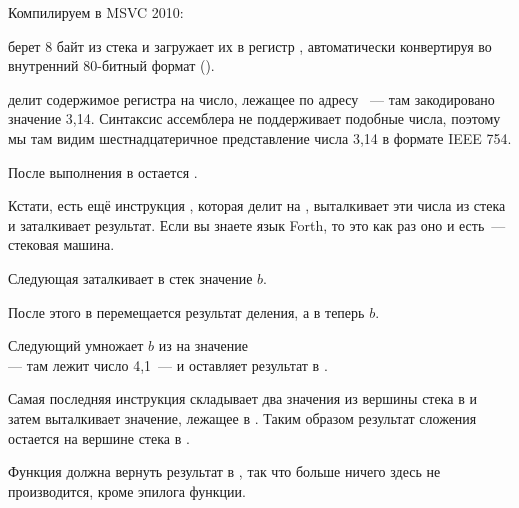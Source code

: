 
Компилируем в MSVC 2010:



\FLD берет 8 байт из стека и загружает их в регистр , автоматически конвертируя во внутренний 
80-битный формат ().

\FDIV делит содержимое регистра  на число, лежащее по адресу ~--- 
там закодировано значение 3,14. Синтаксис ассемблера не поддерживает подобные числа, 
поэтому мы там видим шестнадцатеричное представление числа 3,14 в формате IEEE 754.

После выполнения \FDIV в  остается .

Кстати, есть ещё инструкция \FDIVP, которая делит  на , 
выталкивает эти числа из стека и заталкивает результат. 
Если вы знаете язык Forth\FNURLFORTH, то это как раз оно и есть~--- стековая машина\FNURLSTACK.

Следующая \FLD заталкивает в стек значение $b$.

После этого в  перемещается результат деления, а в  теперь $b$.

Следующий \FMUL умножает $b$ из  на значение \\
 --- там лежит число 4,1~--- и оставляет результат в .

Самая последняя инструкция \FADDP складывает два значения из вершины стека 
в  и затем выталкивает значение, лежащее в . 
Таким образом результат сложения остается на вершине стека в .

Функция должна вернуть результат в , так что больше ничего здесь не производится, 
кроме эпилога функции.


